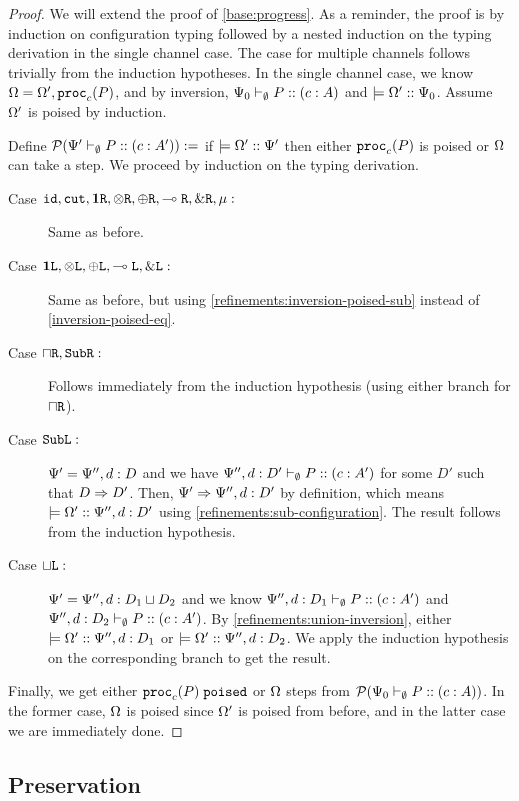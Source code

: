 \begin{proof}
We will extend the proof of \cref{base:progress}. As a reminder, the proof is by induction on configuration typing followed by a nested induction on the typing derivation in the single channel case. The case for multiple channels follows trivially from the induction hypotheses. In the single channel case, we know $\Omega = \Omega', \mathtt{proc}_{c}(P)$, and by inversion, ${\Psi_0} \vdash_{\emptyset} P :: (c : A)$ and $\models {\Omega'} :: {\Psi_0}$. Assume $\Omega'$ is poised by induction.

  Define $\pred{\typeRecD{\ctx'}{\emptyset}{P}{c}{A'}} :=$ if $\models {\Omega'} :: {\Psi'}$ then either $\mathtt{proc}_{c}(P)$ is poised or $\Omega$ can take a step. We proceed by induction on the typing derivation.
    \begin{description}
      \item[Case $\texttt{id}, \texttt{cut}, \mathbf{1}\texttt{R}, \otimes\texttt{R}, \oplus\texttt{R}, \multimap\texttt{R}, \&\texttt{R}, \mu :$] Same as before.

      \item[Case $\mathbf{1}\texttt{L}, \otimes\texttt{L}, \oplus\texttt{L}, \multimap\texttt{L}, \&\texttt{L} :$] Same as before, but using \cref{refinements:inversion-poised-sub} instead of \cref{inversion-poised-eq}.

      \item[Case $\mathbin{\sqcap}\texttt{R}, \texttt{Sub}\texttt{R} :$] Follows immediately from the induction hypothesis (using either branch for $\mathbin{\sqcap}\texttt{R}$).

      \item[Case $\texttt{Sub}\texttt{L} :$] $\Psi' = \Psi'', d : D$ and we have ${\Psi'', d : D'} \vdash_{\emptyset} P :: (c : A')$ for some $D'$ such that $D \mathrel\Rightarrow D'$. Then, $\Psi' \mathrel\Rightarrow \Psi'', d : D'$ by definition, which means $\models {\Omega'} :: {\Psi'', d : D'}$ using \cref{refinements:sub-configuration}. The result follows from the induction hypothesis.

      \item[Case $\mathbin{\sqcup}\texttt{L} :$] $\Psi' = \Psi'', d : D_1 \mathbin{\sqcup} D_2$ and we know ${\Psi'', d : D_1} \vdash_{\emptyset} P :: (c : A')$ and ${\Psi'', d : D_2} \vdash_{\emptyset} P :: (c : A')$. By \cref{refinements:union-inversion}, either $\models {\Omega'} :: {\Psi'', d : D_1}$ or $\models {\Omega'} :: {\Psi'', d : D_2}$. We apply the induction hypothesis on the corresponding branch to get the result.
    \end{description}

    Finally, we get either $\mathtt{proc}_{c}(P)\;\mathtt{poised}$ or $\Omega$ steps from $\pred{\typeRecD {\ctx_0} \emptyset P c A}$. In the former case, $\Omega$ is poised since $\Omega'$ is poised from before, and in the latter case we are immediately done.
\end{proof}


\subsection{Preservation}

